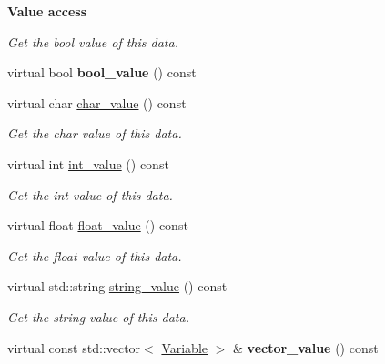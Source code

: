 \begin{Indent}{\bf Value access}\par
{\em Get the bool value of this data. }\begin{DoxyCompactItemize}
\item 
virtual bool {\bfseries bool\+\_\+value} () const \hypertarget{classcreek_1_1_data_a8ffa371124ef8e8cdc3829385c335690}{}\label{classcreek_1_1_data_a8ffa371124ef8e8cdc3829385c335690}

\item 
virtual char \hyperlink{classcreek_1_1_data_a3a5ebc4cab593919d4a96e5f60f78c3b}{char\+\_\+value} () const \hypertarget{classcreek_1_1_data_a3a5ebc4cab593919d4a96e5f60f78c3b}{}\label{classcreek_1_1_data_a3a5ebc4cab593919d4a96e5f60f78c3b}

\begin{DoxyCompactList}\small\item\em Get the char value of this data. \end{DoxyCompactList}\item 
virtual int \hyperlink{classcreek_1_1_data_a8d2f23dccfb724a22122adcfb44cf9e2}{int\+\_\+value} () const \hypertarget{classcreek_1_1_data_a8d2f23dccfb724a22122adcfb44cf9e2}{}\label{classcreek_1_1_data_a8d2f23dccfb724a22122adcfb44cf9e2}

\begin{DoxyCompactList}\small\item\em Get the int value of this data. \end{DoxyCompactList}\item 
virtual float \hyperlink{classcreek_1_1_data_a4d49fe5515b428c730d58410726d075f}{float\+\_\+value} () const \hypertarget{classcreek_1_1_data_a4d49fe5515b428c730d58410726d075f}{}\label{classcreek_1_1_data_a4d49fe5515b428c730d58410726d075f}

\begin{DoxyCompactList}\small\item\em Get the float value of this data. \end{DoxyCompactList}\item 
virtual std\+::string \hyperlink{classcreek_1_1_data_aa2183618da1000f7716b29b19945f2e8}{string\+\_\+value} () const \hypertarget{classcreek_1_1_data_aa2183618da1000f7716b29b19945f2e8}{}\label{classcreek_1_1_data_aa2183618da1000f7716b29b19945f2e8}

\begin{DoxyCompactList}\small\item\em Get the string value of this data. \end{DoxyCompactList}\item 
virtual const std\+::vector$<$ \hyperlink{classcreek_1_1_variable}{Variable} $>$ \& {\bfseries vector\+\_\+value} () const \hypertarget{classcreek_1_1_data_a2312f2efa6e0dd1afe8551e951fe3962}{}\label{classcreek_1_1_data_a2312f2efa6e0dd1afe8551e951fe3962}

\end{DoxyCompactItemize}
\end{Indent}
